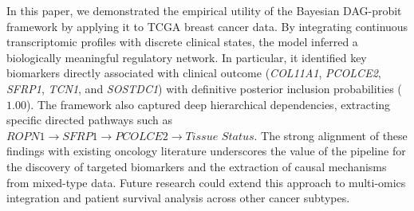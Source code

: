 \documentclass[twoside]{article}
\begin{document}
In this paper, we demonstrated the empirical utility of the Bayesian DAG-probit framework \citep{Nazari:2026} by applying it to TCGA breast cancer data. 
By integrating continuous transcriptomic profiles with discrete clinical states, the model inferred a biologically meaningful regulatory network. 
In particular, it identified key biomarkers directly associated with clinical outcome (\textit{COL11A1}, \textit{PCOLCE2}, \textit{SFRP1}, \textit{TCN1}, and \textit{SOSTDC1}) with definitive posterior inclusion probabilities ($1.00$). 
The framework also captured deep hierarchical dependencies, extracting specific directed pathways such as $\textit{ROPN1} \rightarrow \textit{SFRP1} \rightarrow \textit{PCOLCE2} \rightarrow \textit{Tissue Status}$. 
The strong alignment of these findings with existing oncology literature underscores the value of the pipeline for the discovery of targeted biomarkers and the extraction of causal mechanisms from mixed-type data. Future research could extend this approach to multi-omics integration and patient survival analysis across other cancer subtypes.
\end{document}
